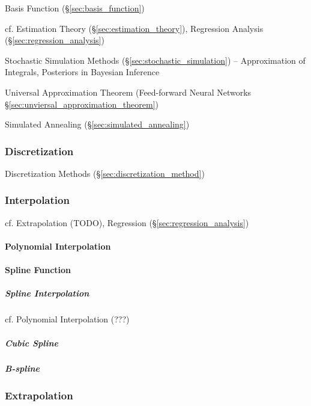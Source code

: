 Basis Function (\S\ref{sec:basis_function})

\fist cf. Estimation Theory (\S\ref{sec:estimation_theory}), Regression Analysis
(\S\ref{sec:regression_analysis})

Stochastic Simulation Methods (\S\ref{sec:stochastic_simulation}) --
Approximation of Integrals, Posteriors in Bayesian Inference

\fist Universal Approximation Theorem (Feed-forward Neural Networks
\S\ref{sec:unviersal_approximation_theorem})

\fist Simulated Annealing (\S\ref{sec:simulated_annealing})



\subsubsection{Discretization}\label{sec:discretization}

Discretization Methods (\S\ref{sec:discretization_method})



\subsubsection{Interpolation}\label{sec:interpolation}

cf. Extrapolation (TODO), Regression (\S\ref{sec:regression_analysis})



\paragraph{Polynomial Interpolation}\label{sec:polynomial_interpolation}\hfill

\paragraph{Spline Function}\label{sec:spline}\hfill

\subparagraph{Spline Interpolation}\label{sec:spline_interpolation}\hfill

cf. Polynomial Interpolation (???) %



\subparagraph{Cubic Spline}\label{sec:cubic_spline}\hfill

\subparagraph{B-spline}\label{sec:b_spline}\hfill



\subsubsection{Extrapolation}\label{sec:extrapolation}

